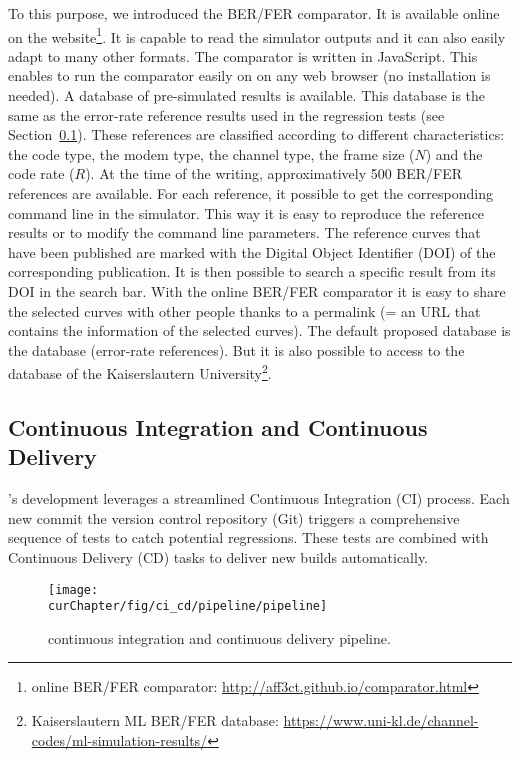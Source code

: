 To this purpose, we introduced the BER/FER comparator. It is available online on
the \AFFECT website\footnote{\AFFECT online BER/FER comparator:
\url{http://aff3ct.github.io/comparator.html}}. It is capable to read the
\AFFECT simulator outputs and it can also easily adapt to many other formats.
The comparator is written in JavaScript. This enables to run the comparator
easily on on any web browser (no installation is needed). A database of \AFFECT
pre-simulated results is available. This database is the same as the error-rate
reference results used in the regression tests (see
Section~\ref{sec:aff3ct_ci_cd}). These references are classified according to
different characteristics: the code type, the modem type, the channel type,
the frame size ($N$) and the code rate ($R$). At the time of the writing,
approximatively 500 BER/FER references are available. For each reference, it
possible to get the corresponding command line in the \AFFECT simulator. This
way it is easy to reproduce the reference results or to modify the command line
parameters. The reference curves that have been published are marked with
the Digital Object Identifier (DOI) of the corresponding publication. It is then
possible to search a specific result from its DOI in the search bar. With the
online BER/FER comparator it is easy to share the selected curves with other
people thanks to a permalink (= an URL that contains the information of the
selected curves). The default proposed database is the \AFFECT database
(error-rate references). But it is also possible to access to the database of
the Kaiserslautern University\footnote{Kaiserslautern ML BER/FER database:
\url{https://www.uni-kl.de/channel-codes/ml-simulation-results/}}.

\subsection{Continuous Integration and Continuous Delivery}
\label{sec:aff3ct_ci_cd}

\AFFECT's development leverages a streamlined Continuous Integration (CI)
process. Each new commit the version control repository (Git) triggers a
comprehensive sequence of tests to catch potential regressions. These tests are
combined with Continuous Delivery (CD) tasks to deliver new \AFFECT builds
automatically.

\begin{figure}[htp]
  \centering
  \texttt{[image: \\curChapter/fig/ci\_cd/pipeline/pipeline]}
  \caption{\AFFECT continuous integration and continuous delivery pipeline.}
  \label{fig:aff3ct_ci_cd_pipeline}
\end{figure}


